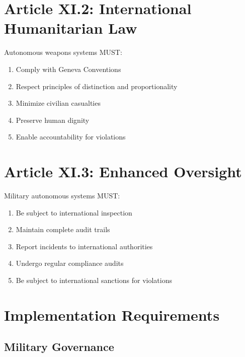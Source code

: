 \vspace{0.5cm}

\section{Article XI.2: International Humanitarian Law}

\begin{articlebox}
Autonomous weapons systems MUST:
\begin{enumerate}
    \item Comply with Geneva Conventions
    \item Respect principles of distinction and proportionality
    \item Minimize civilian casualties
    \item Preserve human dignity
    \item Enable accountability for violations
\end{enumerate}
\end{articlebox}

\vspace{0.5cm}

\section{Article XI.3: Enhanced Oversight}

\begin{articlebox}
Military autonomous systems MUST:
\begin{enumerate}
    \item Be subject to international inspection
    \item Maintain complete audit trails
    \item Report incidents to international authorities
    \item Undergo regular compliance audits
    \item Be subject to international sanctions for violations
\end{enumerate}
\end{articlebox}

\vspace{0.5cm}

\section{Implementation Requirements}

\subsection{Military Governance}

